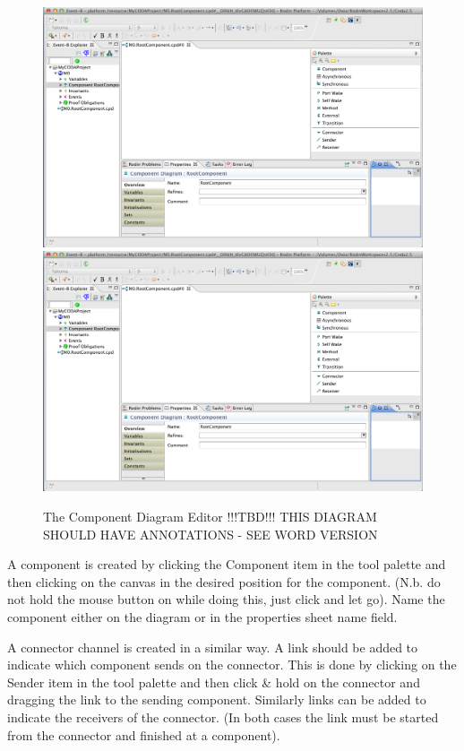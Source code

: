 \begin{figure}[!htbp]
  \centering
  \ifplastex
  \includegraphics[width=1024]{figures/image5.png}
  \else
  \includegraphics[width=1.0\textwidth]{figures/image5.png}
  \fi
  \caption{The Component Diagram Editor !!!TBD!!! THIS DIAGRAM SHOULD HAVE ANNOTATIONS - SEE WORD VERSION}
  \label{fig:TheComponentDiagramEditor}
\end{figure}


A component is created by clicking the Component item in the tool palette and then clicking on the canvas in the desired position for the component. (N.b. do not hold the mouse button on while doing this, just click and let go). Name the component either on the diagram or in the properties sheet name field.


A connector channel is created in a similar way. A link should be added to indicate which component sends on the connector. This is done by clicking on the Sender item in the tool palette and then click \& hold on the connector and dragging the link to the sending component. Similarly links can be added to indicate the receivers of the connector. (In both cases the link must be started from the connector and finished at a component).



